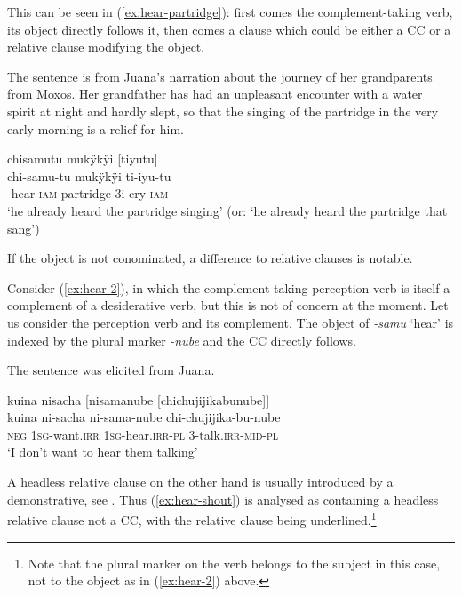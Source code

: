 This can be seen in (\ref{ex:hear-partridge}): first comes the complement-taking verb, its object directly follows it, then comes a clause which could be either a CC or a relative clause modifying the object.

The sentence is from Juana’s narration about the journey of her grandparents from Moxos. Her grandfather has had an unpleasant encounter with a water spirit at night and hardly slept, so that the singing of the partridge in the very early morning is a relief for him.

\ea\label{ex:hear-partridge}
\begingl
\glpreamble chisamutu mukÿkÿi \textup{[}tiyutu\textup{]}\\
\gla chi-samu-tu mukÿkÿi ti-iyu-tu\\
-hear-\textsc{iam} partridge 3i-cry-\textsc{iam}\\
\glft ‘he already heard the partridge singing’ (or: ‘he already heard the partridge that sang’)
\endgl
\trailingcitation{[jxx-p151016l-2.212]}
\xe


If the object is not conominated, a difference to relative clauses is notable.

Consider (\ref{ex:hear-2}), in which the complement-taking perception verb is itself a complement of a desiderative verb, but this is not of concern at the moment. Let us consider the perception verb and its complement. The object of \textit{-samu} ‘hear’ is indexed by the plural marker \textit{-nube} and the CC directly follows.

The sentence was elicited from Juana. 

\ea\label{ex:hear-2}
\begingl
\glpreamble kuina nisacha \textup{[}nisamanube \textup{[}chichujijikabunube\textup{]}\textup{]}\\
\gla kuina ni-sacha ni-sama-nube chi-chujijika-bu-nube\\
\glb \textsc{neg} 1\textsc{sg}-want.\textsc{irr} 1\textsc{sg}-hear.\textsc{irr}-\textsc{pl} 3-talk.\textsc{irr}-\textsc{mid}-\textsc{pl}\\
\glft ‘I don’t want to hear them talking’
\endgl
\trailingcitation{[jxx-e190210s-01]}
\xe


A headless relative clause on the other hand is usually introduced by a demonstrative, see . Thus (\ref{ex:hear-shout}) is analysed as containing a headless relative clause not a CC, with the relative clause being underlined.\footnote{Note that the plural marker on the verb belongs to the subject in this case, not to the object as in (\ref{ex:hear-2}) above.} 

